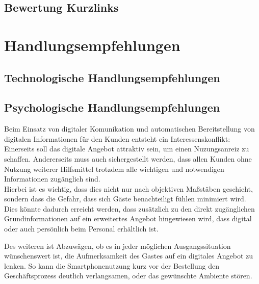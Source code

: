 
\subsection{Bewertung Kurzlinks} %
\label{sub:bewertung_kurzlinks}



\newpage
\section{Handlungsempfehlungen} %
\label{sec:handlungsempfehlungen}

\subsection{Technologische Handlungsempfehlungen} %
\label{sub:technologische_handlungsempfehlungen}


\subsection{Psychologische Handlungsempfehlungen} %
\label{sub:psychologische_handlungsempfehlungen}
Beim Einsatz von digitaler Komunikation und automatischen Bereitstellung von digitalen Informationen für den Kunden entsteht ein Interessenskonflikt: Einerseits soll das digitale Angebot attraktiv sein, um einen Nuzungsanreiz zu schaffen. Andererseits muss auch sichergestellt werden, dass allen Kunden ohne Nutzung weiterer Hilfsmittel trotzdem alle wichtigen und notwendigen Informationen zugänglich sind.\\
Hierbei ist es wichtig, dass dies nicht nur nach objektiven Maßstäben geschieht, sondern dass die Gefahr, dass sich Gäste benachteiligt fühlen minimiert wird. Dies könnte dadurch erreicht werden, dass zusätzlich zu den direkt zugänglichen Grundinformationen auf ein erweitertes Angebot hingewiesen wird, dass digital oder auch persönlich beim Personal erhältlich ist.

Des weiteren ist Abzuwägen, ob es in jeder möglichen Ausgangssituation wünschenswert ist, die Aufmerksamkeit des Gastes auf ein digitales Angebot zu lenken. So kann die Smartphonenutzung kurz vor der Bestellung den Geschäftsprozess deutlich verlangsamen, oder das gewünschte Ambiente stören. 


